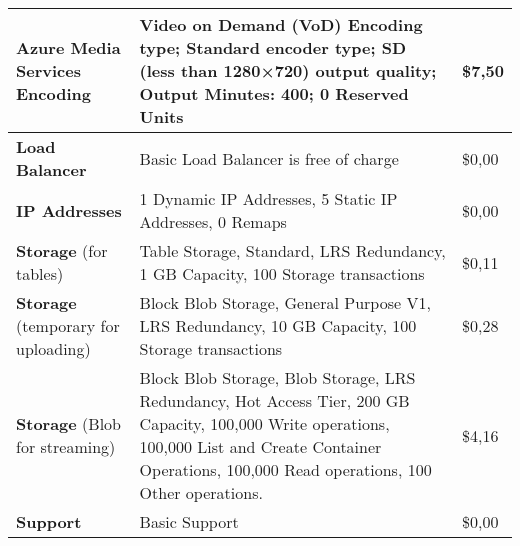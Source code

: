 \begin{adjustbox}{angle=90}
\begin{tabularx}{\textheight}{|l||X|m{4cm}|}
                \textbf{Azure Media Services Encoding}      & Video on Demand (VoD) Encoding type; Standard encoder type; SD (less than 1280×720) output quality; Output Minutes: 400; 0 Reserved Units                                           & \$7,50                                   \\ \hline
                \textbf{Load Balancer}            & Basic Load Balancer is free of charge                                                                                                                                                        & \$0,00                                   \\ \hline
                \textbf{IP Addresses}             & 1 Dynamic IP Addresses, 5 Static IP Addresses, 0 Remaps                                                                                                                                      & \$0,00                                   \\ \hline
                \textbf{Storage} (for tables)                  & Table Storage, Standard, LRS Redundancy, 1 GB Capacity, 100 Storage transactions                                                                                                 & \$0,11                                   \\ \hline
                \textbf{Storage} (temporary for uploading)                     & Block Blob Storage, General Purpose V1, LRS Redundancy, 10 GB Capacity, 100 Storage transactions                                                                & \$0,28                                   \\ \hline
\textbf{Storage} (Blob for streaming)                           & Block Blob Storage, Blob Storage, LRS Redundancy, Hot Access Tier, 200 GB Capacity, 100,000 Write operations, 100,000 List and Create Container Operations, 100,000 Read operations, 100 Other operations. & \$4,16                                   \\ \hline
\textbf{Support}                                  & Basic Support                                                                                                                                                                                                                                          & \$0,00                                   \\ \hline

\end{tabularx}
\end{adjustbox}
